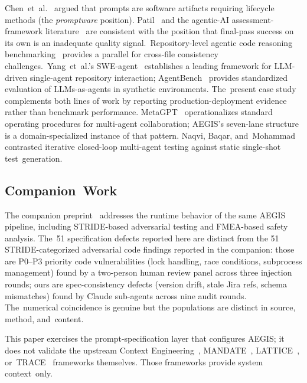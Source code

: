 \documentclass[software,article,accept,pdftex,oneauthor]{Definitions/mdpi}
\def\hl#1{#1}
\begin{document}
Chen~et~al.~\cite{chen2025promptware} argued that prompts are software artifacts requiring lifecycle methods (the \emph{\hl{promptware}} position). Patil~\cite{patil2025llm_sqa} and the agentic-AI assessment-framework literature~\cite{akshathala2025beyond_task_completion} are consistent with the position that final-pass success on its own is an inadequate quality signal.~Repository-level agentic code reasoning benchmarking~\cite{li2026repo_reason} provides a parallel for cross-file consistency challenges.~Yang~et~al.'s SWE-agent~\cite{yang2024sweagent} establishes a leading framework for LLM-driven single-agent repository interaction; AgentBench~\cite{liu2024agentbench} provides standardized evaluation of LLMs-as-agents in synthetic environments. The~present case study complements both lines of work by reporting production-deployment evidence rather than benchmark performance. MetaGPT~\cite{hong2023metagpt} operationalizes standard operating procedures for multi-agent collaboration; AEGIS's seven-lane structure is a domain-specialized instance of that pattern. Naqvi, Baqar, and~Mohammad~\cite{naqvi2026agentic_testing} contrasted iterative closed-loop multi-agent testing against static single-shot test~generation.

\subsection{Companion~Work}

The companion preprint~\cite{calboreanu2026aegis_companion} addresses the runtime behavior of the same AEGIS pipeline, including STRIDE-based adversarial testing and FMEA-based safety analysis. The~51 specification defects reported here are distinct from the 51 STRIDE-categorized adversarial code findings reported in the companion: those are P0--P3 priority code vulnerabilities (lock handling, race conditions, subprocess management) found by a two-person human review panel across three injection rounds; ours are spec-consistency defects (version drift, stale Jira refs, schema mismatches) found by Claude sub-agents across nine audit rounds. The~numerical coincidence is genuine but the populations are distinct in source, method, and~content.

This paper exercises the prompt-specification layer that configures AEGIS; it does not validate the upstream Context Engineering~\cite{calboreanu2026context}, MANDATE~\cite{calboreanu2026mandate}, LATTICE~\cite{calboreanu2026lattice}, or~TRACE~\cite{calboreanu2026trace} frameworks themselves. Those frameworks provide system context~only.
\end{document}
